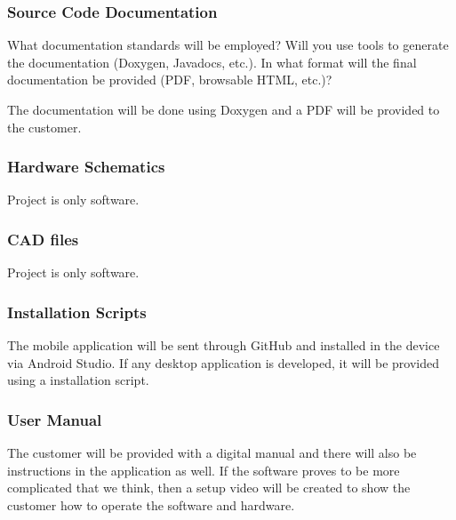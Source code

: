 \subsubsection{Source Code Documentation}
What documentation standards will be employed? Will you use tools to generate the documentation (Doxygen, Javadocs, etc.). In what format will the final documentation be provided (PDF, browsable HTML, etc.)?

The documentation will be done using Doxygen and a PDF will be provided to the customer.

\subsubsection{Hardware Schematics}
Project is only software.

\subsubsection{CAD files}
Project is only software.

\subsubsection{Installation Scripts}
The mobile application will be sent through GitHub and installed in the device via Android Studio. If any desktop application is developed, it will be provided using a installation script. 

\subsubsection{User Manual}
The customer will be provided with a digital manual and there will also be instructions in the application as well. If the software proves to be more complicated that we think, then a setup video will be created to show the customer how to operate the software and hardware.
